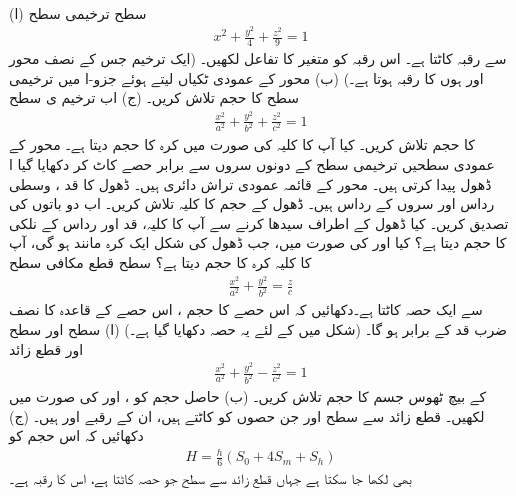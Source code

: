 \\
(ا)  سطح   ترخیمی سطح
 \begin{align*}
x^2+\tfrac{y^2}{4}+\tfrac{z^2}{9}=1
\end{align*}
 سے رقبہ  کاٹتا ہے۔ اس رقبہ کو متغیر  کا تفاعل لکھیں۔ (ایک ترخیم جس کے نصف محور  اور  ہوں کا رقبہ  ہوتا ہے۔)     (ب) محور  کے عمودی  ٹکیاں  لیتے ہوئے  جزو-ا میں ترخیمی سطح کا حجم تلاش کریں۔ (ج) اب ترخیم ی سطح 
\begin{align*}
\tfrac{x^2}{a^2}+\tfrac{y^2}{b^2}+\tfrac{z^2}{c^2}=1
\end{align*}
 کا حجم تلاش کریں۔ کیا آپ کا کلیہ  کی صورت میں کرہ کا حجم دیتا ہے۔ 
محور  کے عمودی سطحیں   ترخیمی  سطح کے دونوں سروں سے   برابر حصے کاٹ کر دکھایا گیا ا  ڈھول   پیدا کرتی ہیں۔ محور  کے قائمہ عمودی تراش دائری ہیں۔  ڈھول کا قد ،  وسطی رداس  اور سروں کے رداس  ہیں۔ ڈھول کے حجم کا کلیہ تلاش کریں۔ اب دو باتوں  کی تصدیق کریں۔  کیا  ڈھول کے اطراف سیدھا کرنے سے آپ کا کلیہ، قد  اور رداس  کے  نلکی کا حجم دیتا ہے؟  کیا  اور   کی صورت میں، جب   ڈھول    کی شکل ایک کرہ مانند ہو گی، آپ کا کلیہ کرہ کا حجم دیتا ہے؟
سطح   قطع مکافی سطح
\begin{align*}
\frac{x^2}{a^2}+\frac{y^2}{b^2}=\frac{z}{c}
\end{align*}
سے ایک حصہ کاٹتا ہے۔دکھائیں کہ اس حصے کا حجم ، اس حصے کے قاعدہ کا نصف ضرب قد کے برابر ہو گا۔ (شکل  میں  کے لئے یہ حصہ دکھایا گیا ہے۔)
(ا) سطح  اور سطح  اور قطع زائد
\begin{align*}
\frac{x^2}{a^2}+\frac{y^2}{b^2}-\frac{z^2}{c^2}=1
\end{align*}
کے بیچ  ٹھوس جسم کا حجم تلاش کریں۔ (ب)  حاصل حجم کو ،   اور   کی صورت میں لکھیں۔  قطع زائد سے سطح  اور   جن حصوں کو کاٹتے ہیں، ان کے رقبے  اور  ہیں۔ (ج) دکھائیں کہ اس حجم کو
\begin{align*}
H=\frac{h}{6}(S_0+4S_m+S_h)
\end{align*}
بھی لکھا جا سکتا ہے جہاں قطع زائد سے سطح    جو حصہ کاٹتا ہے، اس کا رقبہ  ہے۔
